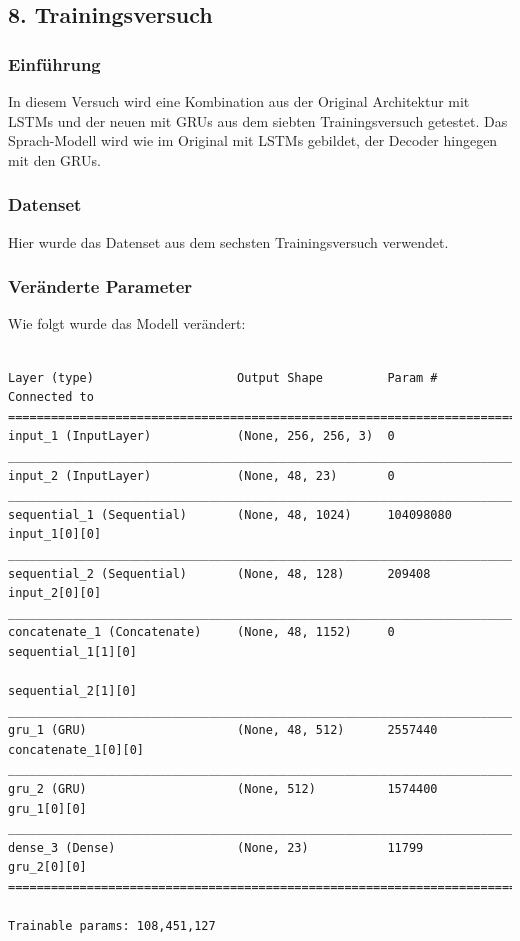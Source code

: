 \documentclass[pdftex,a4paper,halfparskip, article]{scrartcl}
\begin{document}
\subsection{8. Trainingsversuch}



\subsubsection*{Einführung}

In diesem Versuch wird eine Kombination aus der Original Architektur mit LSTMs und der neuen mit GRUs aus dem siebten Trainingsversuch getestet. Das Sprach-Modell wird wie im Original mit LSTMs gebildet, der Decoder hingegen mit den GRUs. 

\subsubsection*{Datenset}

Hier wurde das Datenset aus dem sechsten Trainingsversuch verwendet.

\subsubsection*{Veränderte Parameter}

Wie folgt wurde das Modell verändert:
\begin{verbatim}

Layer (type)                    Output Shape         Param #     Connected to
================================================================================
input_1 (InputLayer)            (None, 256, 256, 3)  0
________________________________________________________________________________
input_2 (InputLayer)            (None, 48, 23)       0
________________________________________________________________________________
sequential_1 (Sequential)       (None, 48, 1024)     104098080   input_1[0][0]
________________________________________________________________________________
sequential_2 (Sequential)       (None, 48, 128)      209408      input_2[0][0]
________________________________________________________________________________
concatenate_1 (Concatenate)     (None, 48, 1152)     0           sequential_1[1][0]
                                                                 sequential_2[1][0]
________________________________________________________________________________
gru_1 (GRU)                     (None, 48, 512)      2557440     concatenate_1[0][0]
________________________________________________________________________________
gru_2 (GRU)                     (None, 512)          1574400     gru_1[0][0]
________________________________________________________________________________
dense_3 (Dense)                 (None, 23)           11799       gru_2[0][0]
================================================================================

Trainable params: 108,451,127

\end{verbatim}
\end{document}
